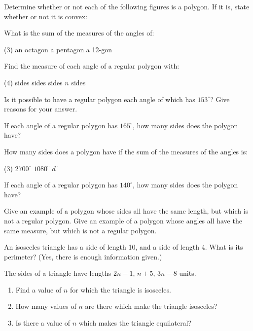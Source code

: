 \documentclass[12pt]{book} %
\begin{document}
\setcounter{Exercise}{0}
\begin{ExerciseList}
\Exercise Determine whether or not each of the following figures is a polygon. If it is, state whether or not it is convex:


\Exercise What is the sum of the measures of the angles of:
\begin{tasks}(3)
\task[(a)] an octagon
\task[(b)] a pentagon
\task[(c)] a 12-gon
\end{tasks}

\Exercise Find the measure of each angle of a regular polygon with:
\begin{tasks}(4)
 sides
 sides
 sides
\task[(d)] $n$ sides
\end{tasks}

\Exercise Is it possible to have a regular polygon each angle of which has $153^\circ$? Give reasons for your answer.

\Exercise If each angle of a regular polygon has $165^\circ$, how many sides does the polygon have?

\Exercise How many sides does a polygon have if the sum of the measures of the angles is:
\begin{tasks}(3)
\task[(a)] $2700^\circ$
\task[(b)] $1080^\circ$
\task[(c)] $d^\circ$
\end{tasks}

\Exercise If each angle of a regular polygon has $140^\circ$, how many sides does the polygon have?

\Exercise Give an example of a polygon whose sides all have the same length, but which is not a regular polygon. Give an example of a polygon whose angles all have the same measure, but which is not a regular polygon.

\Exercise An isosceles triangle has a side of length 10, and a side of length 4. What is its perimeter? (Yes, there is enough information given.)

\Exercise The sides of a triangle have lengths $2n-1$, $n+5$, $3n-8$ units.
\begin{enumerate}
\item[(a)] Find a value of $n$ for which the triangle is isosceles.
\item[(b)] How many values of $n$ are there which make the triangle isosceles?
\item[(c)] Is there a value of $n$ which makes the triangle equilateral?
\end{enumerate}


\end{ExerciseList}
\end{document}
